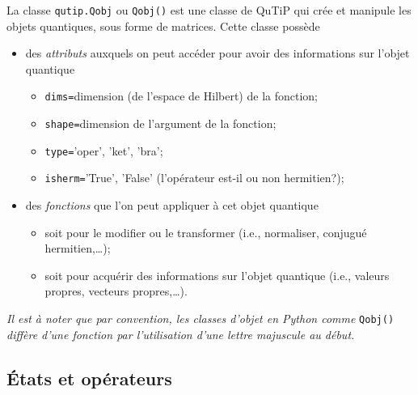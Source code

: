 La classe \texttt{qutip.Qobj} ou \texttt{Qobj()} est une classe de QuTiP qui 
crée et manipule les objets quantiques, sous forme de matrices. Cette classe 
possède 
\begin{itemize}
 \item des \emph{attributs} auxquels on peut accéder pour avoir des 
informations 
sur l'objet quantique 
\begin{itemize}
\item \texttt{dims=}dimension (de l'espace de Hilbert) de la fonction; 

\item \texttt{shape=}dimension de l'argument de la fonction;
 
\item \texttt{type=}'oper', 'ket', 'bra'; 

\item \texttt{isherm=}'True', 'False' (l'opérateur est-il ou non hermitien?);   
\end{itemize}

\item des \emph{fonctions} que l'on peut appliquer à cet objet quantique  
\begin{itemize}

\item soit pour le modifier ou le transformer (i.e., normaliser, conjugué 
hermitien,\ldots);

\item soit pour acquérir des informations sur l'objet quantique (i.e., valeurs 
propres, vecteurs propres,\ldots).                                  
\end{itemize}

\end{itemize}

\emph{Il est à noter que par convention, les classes d'objet en Python comme} 
\texttt{Qobj()} \emph{diffère d'une fonction par l'utilisation d'une lettre 
majuscule au début.}

\subsection{États et opérateurs}

